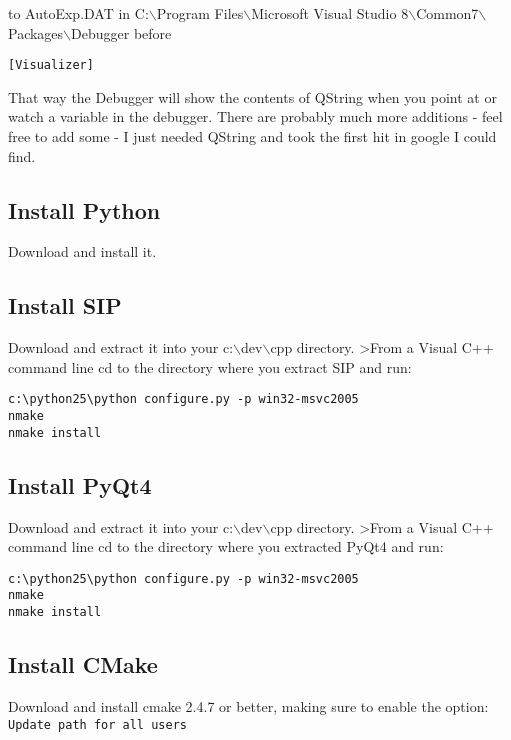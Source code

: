 to AutoExp.DAT in C:$\backslash$Program Files$\backslash$Microsoft Visual Studio 8$\backslash$Common7$\backslash$Packages$\backslash$Debugger before 

\begin{verbatim}
[Visualizer]
\end{verbatim}

That way the Debugger will show the contents of QString when you point at or
watch a variable in the debugger.  There are probably much more additions -
feel free to add some - I just needed QString and took the first hit in google
I could find.

\subsection{Install Python}
Download  and install it.

\subsection{Install SIP}
Download  and extract it 
into your c:$\backslash$dev$\backslash$cpp directory.
>From a Visual C++ command line cd to the directory where you extract SIP and run:

\begin{verbatim}
c:\python25\python configure.py -p win32-msvc2005
nmake
nmake install
\end{verbatim}

\subsection{Install PyQt4}
Download  and extract it 
into your c:$\backslash$dev$\backslash$cpp directory.
>From a Visual C++ command line cd to the directory where you extracted PyQt4 and run:

\begin{verbatim}
c:\python25\python configure.py -p win32-msvc2005
nmake
nmake install
\end{verbatim}

\subsection{Install CMake}
Download and install cmake 2.4.7 or better, making sure to enable the option: \texttt{Update path for all users}

